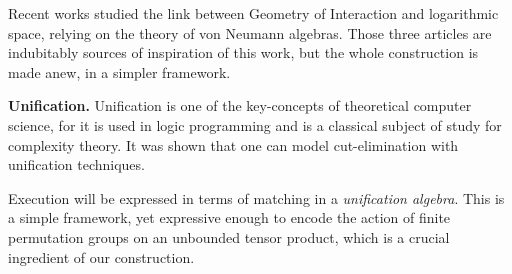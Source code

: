 Recent works \cite{girard_normativity_2012,aubert_characterizing_2012,seiller_logarithmic_2013} studied the link between Geometry of Interaction and logarithmic space, relying on the theory of von Neumann algebras.
Those three articles are indubitably sources of inspiration of this work, but the whole construction is made anew, in a simpler framework.
%

\smallskip\noindent
\textbf{Unification.} 
Unification is one of the key-concepts of theoretical computer science, for it is used in logic programming and is a classical subject of study for complexity theory.
It was shown \cite{girard_geometry_1995,girard_three_lightings} that one can model \hbox{cut-elimination} with unification techniques.
%

Execution will be expressed in terms of matching in a \emph{unification algebra}. This is a simple framework, yet expressive enough to encode the action of finite permutation groups on an unbounded tensor product, which is a crucial ingredient of our construction.
%

